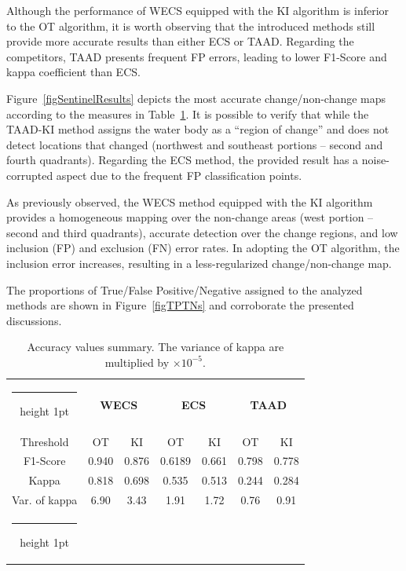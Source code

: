 \documentclass[journal]{IEEEtran}
\makeatletter
\newcommand{\thickhline}{\noalign {\ifnum 0=`}\fi \hrule height 1pt \futurelet \reserved@a \@xhline}
\makeatother
\begin{document}
Although the performance of WECS equipped with the KI algorithm is inferior to the OT algorithm, it is worth observing that the introduced methods still provide more accurate results than either ECS or TAAD.
Regarding the competitors, TAAD presents frequent FP errors, leading to lower F1-Score and kappa coefficient than ECS.



Figure~\ref{figSentinelResults} depicts the most accurate change/non-change maps according to the measures in Table~\ref{tabAccExpSentinel}.
It is possible to verify that while the TAAD-KI method assigns the water body as a ``region of change'' and does not detect locations that changed (northwest and southeast portions -- second and fourth quadrants).
Regarding the ECS method, the provided result has a noise-corrupted aspect due to the frequent FP classification points.

As previously observed, the WECS method equipped with the KI algorithm provides a homogeneous mapping over the non-change areas (west portion -- second and third quadrants), accurate detection over the change regions, and low inclusion (FP) and exclusion (FN) error rates. In adopting the OT algorithm, the inclusion error increases, resulting in a less-regularized change/non-change map.

The proportions of True/False Positive/Negative assigned to the analyzed methods are shown in Figure~\ref{figTPTNs} and corroborate the presented discussions.




\begin{table}[H]
\caption{Accuracy values summary. The variance of kappa are multiplied by $\times 10^{-5}$.}\label{tabAccExpSentinel}
\centering
\begin{tabular}{ccccccc}
\thickhline
 & \multicolumn{2}{c}{\textbf{WECS}} & \multicolumn{2}{c}{\textbf{ECS}} & \multicolumn{2}{c}{\textbf{TAAD}}\tabularnewline
Threshold & OT & KI & OT & KI & OT & KI\tabularnewline
\hline 
F1-Score & 0.940 & 0.876 & 0.6189 & 0.661 & 0.798 & 0.778\tabularnewline
Kappa & 0.818 & 0.698 & 0.535 & 0.513 & 0.244 & 0.284\tabularnewline
Var. of kappa & 6.90 & 3.43 & 1.91 & 1.72 & 0.76 & 0.91 \tabularnewline
\thickhline
\end{tabular}
\end{table}
\end{document}
